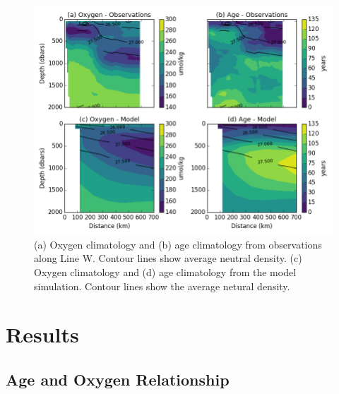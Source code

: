 \begin{figure}
\centering
\includegraphics[width=\linewidth]{age_oxygen_climatology.png}
\caption{(a) Oxygen climatology and (b) age climatology from observations along Line W.
Contour lines show average neutral density. (c) Oxygen climatology and (d) age
climatology from the model simulation. Contour lines show the average netural density.}
\label{fig:oxygen_age_climatology}
\end{figure}

\section{Results}
\label{section:results}
\subsection{Age and Oxygen Relationship}


